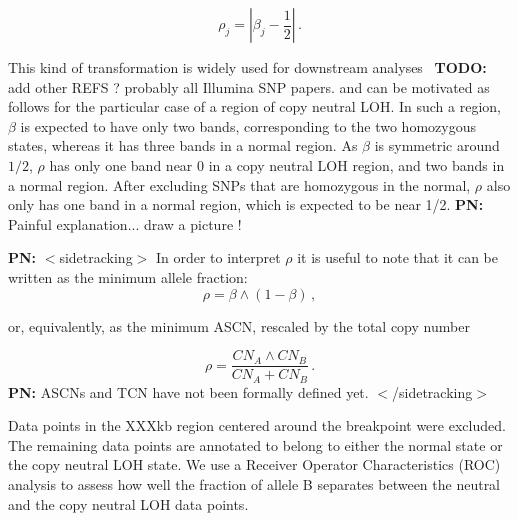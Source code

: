 \documentclass[10pt]{bmc_article}
\newenvironment{bmcformat}{\fussy\setboolean{publ}{true}}{\fussy}
\newenvironment{TODO}{\color{red}\textbf{TODO:}}{}
\newenvironment{PN}{\color{blue}\textbf{PN:}}{}
\begin{document}
\begin{bmcformat}
\begin{displaymath}
  \rho_j = \left\vert \beta_j - \frac{1}{2} \right\vert \,.
\end{displaymath}

This kind of transformation is widely used for downstream analyses~\cite{PeifferD_etal_2006,AttiyehE_etal_2009}
\begin{TODO}
  add other REFS ? probably all Illumina SNP papers.
\end{TODO}
 and can be motivated as follows for the particular case of a region of copy neutral LOH. In such a region, $\beta$ is expected to have only two bands, corresponding to the two homozygous states, whereas it has three bands in a normal region. As $\beta$ is symmetric around $1/2$, $\rho$ has only one band near 0 in a copy neutral LOH region, and two bands in a normal region. After excluding SNPs that are homozygous in the normal, $\rho$ also only has one band in a normal region, which is expected to be near 1/2. 
 \begin{PN}
   Painful explanation... draw a picture !
 \end{PN}

 \begin{PN}
   $<$sidetracking$>$
 \end{PN}
In order to interpret $\rho$ it is useful to note that it can be written as the minimum allele fraction:
\begin{displaymath}
  \rho = \beta \wedge (1-\beta)\,,
\end{displaymath}

or, equivalently, as the minimum ASCN, rescaled by the total copy number

\begin{displaymath}
  \rho = \frac{CN_A \wedge CN_B}{CN_A + CN_B}\,.
\end{displaymath}
\begin{PN}
  ASCNs and TCN have not been formally defined yet.  $<$/sidetracking$>$
\end{PN}

Data points in the  XXXkb region centered around the breakpoint were excluded. The remaining data points are annotated to belong to either the normal state or the copy neutral LOH state. We use a  Receiver Operator Characteristics (ROC) analysis to assess how well the fraction of allele B separates between the neutral and the copy neutral LOH data points.


\end{bmcformat}
\end{document}
